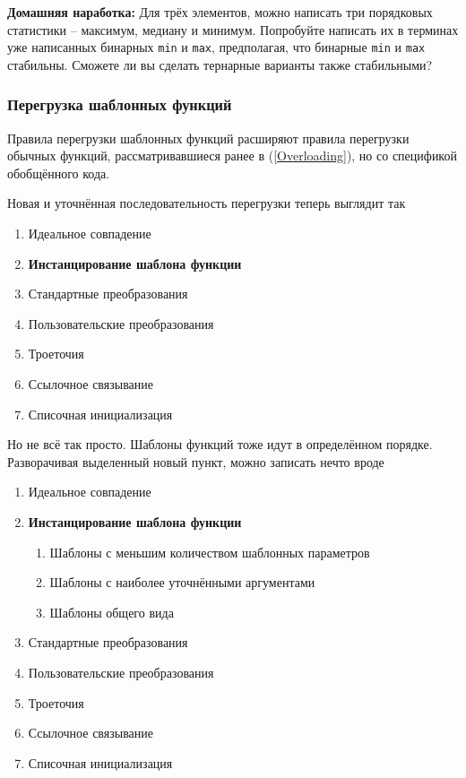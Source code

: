 \documentclass[a4paper,12pt,oneside]{article}
\begin{document}
\textbf{Домашняя наработка:} Для трёх элементов, можно написать три порядковых статистики -- максимум, медиану и минимум. Попробуйте написать их в терминах уже написанных бинарных \lstinline!min! и \lstinline!max!, предполагая, что бинарные \lstinline!min! и \lstinline!max! стабильны. Сможете ли вы сделать тернарные варианты также стабильными?

\subsubsection{Перегрузка шаблонных функций}\label{TemplOverloading}

Правила перегрузки шаблонных функций расширяют правила перегрузки обычных функций, рассматривавшиеся ранее в (\ref{Overloading}), но со спецификой обобщённого кода. 

Новая и уточнённая последовательность перегрузки теперь выглядит так

\begin{enumerate}
\item Идеальное совпадение
\item \textbf{Инстанцирование шаблона функции}
\item Стандартные преобразования
\item Пользовательские преобразования
\item Троеточия
\item Ссылочное связывание
\item Списочная инициализация
\end{enumerate}

Но не всё так просто. Шаблоны функций тоже идут в определённом порядке. Разворачивая выделенный новый пункт, можно записать нечто вроде

\begin{enumerate}
\item Идеальное совпадение
\item \textbf{Инстанцирование шаблона функции}
  \begin{enumerate}
  \item Шаблоны с меньшим количеством шаблонных параметров
  \item Шаблоны с наиболее уточнёнными аргументами
  \item Шаблоны общего вида
  \end{enumerate}
\item Стандартные преобразования
\item Пользовательские преобразования
\item Троеточия
\item Ссылочное связывание
\item Списочная инициализация
\end{enumerate}
\end{document}
